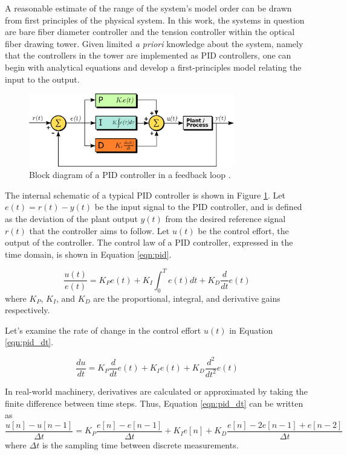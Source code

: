 A reasonable estimate of the range of the system's model order can be drawn from first principles of the physical  system. In this work, the systems in question are bare fiber diameter controller and the tension controller within the optical fiber drawing tower. %
Given limited \emph{a priori} knowledge about the system, namely that the controllers in the tower are implemented as PID controllers, one can begin with analytical equations and develop a first-principles model relating the input to the output. 

\begin{figure}[h!]
    \centering
    \includegraphics[width=0.8\textwidth]{figures/pid.png}
    \caption{Block diagram of a PID controller in a feedback loop \cite{pid}.}
    \label{fig:pid}
\end{figure}

The internal schematic of a typical PID controller is shown in Figure \ref{fig:pid}. Let $e(t) = r(t) - y(t)$ be the input signal to the PID controller, and is defined as the deviation of the plant output $y(t)$ from the desired reference signal $r(t)$ that the controller aims to follow. Let $u(t)$ be the control effort, the output of the controller. The control law of a PID controller, expressed in the time domain, is shown in Equation \eqref{eqn:pid}. 

\begin{equation}
    \label{eqn:pid}
    \frac{u(t)}{e(t)} = K_P e(t) + K_I\int_0^T e(t) dt + K_D \frac{d}{dt} e(t)
\end{equation}
where $K_P$, $K_I$, and $K_D$ are the proportional, integral, and derivative gains respectively. 

Let's examine the rate of change in the control effort $u(t)$ in Equation \eqref{eqn:pid_dt}. 

\begin{equation}
    \label{eqn:pid_dt}
    \frac{du}{dt} = K_P \frac{d}{dt} e(t) + K_I e(t) + K_D \frac{d^2}{dt^2} e(t)
\end{equation}

In real-world machinery, derivatives are calculated or approximated by taking the finite difference \cite{finite_diff} between time steps. Thus, Equation \eqref{eqn:pid_dt} can be written as 
\begin{equation}
    \label{eqn:pid_fd}
        \frac{u[n]-u[n-1]}{\Delta t} 
         = K_P \frac{e[n]-e[n-1]}{\Delta t} + K_I e[n] + K_D \frac{e[n]-2e[n-1]+e[n-2]}{\Delta t}
\end{equation}
where $\Delta t$ is the sampling time between discrete measurements. 

